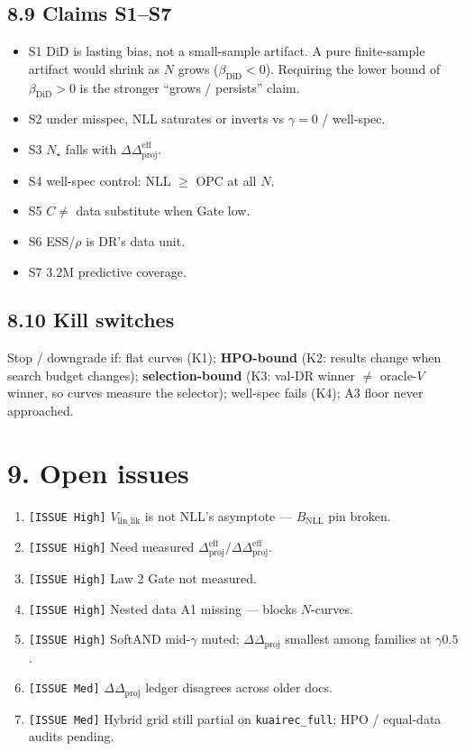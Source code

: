 \documentclass[11pt]{article}
\newcommand{\phonesection}[1]{\Needspace{8\baselineskip}\section*{#1}}
\newcommand{\phonesub}[1]{\Needspace{6\baselineskip}\subsection*{#1}}
\newcommand{\stag}[1]{\texttt{[#1]}}
\newcommand{\DDproj}{\Delta\Delta_{\mathrm{proj}}}
\newcommand{\Dprojeff}{\Delta_{\mathrm{proj}}^{\mathrm{eff}}}
\newcommand{\DDprojeff}{\Delta\Delta_{\mathrm{proj}}^{\mathrm{eff}}}
\begin{document}
\phonesub{8.9 Claims S1--S7}
\begin{itemize}
  \item S1 DiD is lasting bias, not a
        small-sample artifact.  A pure
        finite-sample artifact would shrink
        as $N$ grows ($\beta_{\mathrm{DiD}}<0$).
        Requiring the lower bound of
        $\beta_{\mathrm{DiD}}>0$ is the
        stronger ``grows / persists'' claim.
  \item S2 under misspec, NLL saturates or
        inverts vs $\gamma{=}0$ / well-spec.
  \item S3 $N_{\star}$ falls with
        $\DDprojeff$.
  \item S4 well-spec control: NLL $\ge$ OPC
        at all $N$.
  \item S5 $C\ne$ data substitute when Gate
        low.
  \item S6 ESS/$\rho$ is DR's data unit.
  \item S7 $3.2$M predictive coverage.
\end{itemize}

\phonesub{8.10 Kill switches}
Stop / downgrade if: flat curves (K1);
\textbf{HPO-bound} (K2: results change when
search budget changes); \textbf{selection-bound}
(K3: val-DR winner $\ne$ oracle-$V$ winner,
so curves measure the selector); well-spec
fails (K4); A3 floor never approached.

\phonesection{9. Open issues}

\begin{enumerate}
  \item \stag{ISSUE High} $V_{\mathrm{lin\_lik}}$
        is not NLL's asymptote ---
        $B_{\mathrm{NLL}}$ pin broken.
  \item \stag{ISSUE High} Need measured
        $\Dprojeff/\DDprojeff$.
  \item \stag{ISSUE High} Law 2 Gate not
        measured.
  \item \stag{ISSUE High} Nested data A1
        missing --- blocks $N$-curves.
  \item \stag{ISSUE High} SoftAND mid-$\gamma$
        muted; $\DDproj$ smallest among
        families at $\gamma0.5$.
  \item \stag{ISSUE Med} $\DDproj$ ledger
        disagrees across older docs.
  \item \stag{ISSUE Med} Hybrid grid still
        partial on \texttt{kuairec\_full};
        HPO / equal-data audits pending.
\end{enumerate}
\end{document}
